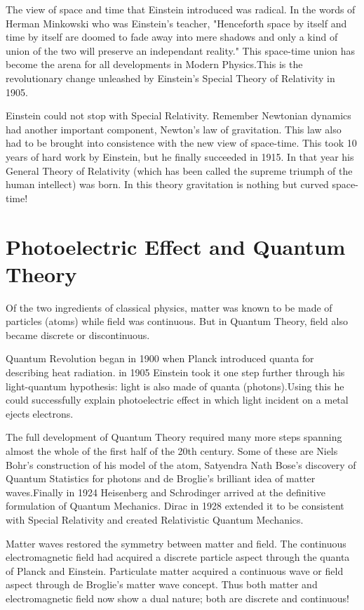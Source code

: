 The view of space and time that Einstein introduced
was radical. In the words of Herman Minkowski who
was Einstein's teacher, "Henceforth space by itself
and time by itself are doomed to fade away into mere
shadows and only a kind of union of the two will
preserve an independant reality." This space-time
union has become the arena for all developments in
Modern Physics.This is the revolutionary change
unleashed by Einstein's Special Theory of Relativity
in 1905.

Einstein could not stop with Special Relativity. Remember
Newtonian dynamics had another important component, Newton's
law of gravitation. This law also had to be brought into
consistence with the new view of space-time. This
took 10 years of hard work by Einstein, but he finally
succeeded in 1915. In that year his General Theory of
Relativity (which has been called the supreme triumph
of the human intellect) was born. In this theory gravitation
is nothing but curved space-time!

\section*{Photoelectric Effect and Quantum Theory}

Of the two ingredients of classical physics, matter was known
to be made of particles (atoms) while field was continuous.
But in Quantum Theory, field also became discrete or discontinuous.

Quantum Revolution began in 1900 when Planck introduced quanta
for describing heat radiation. in 1905 Einstein took it one step
further through his light-quantum hypothesis: light is also made
of quanta (photons).Using this he could successfully explain
photoelectric effect in which light incident on a metal ejects
electrons.

The full development of Quantum Theory required many more steps
spanning almost the whole of the first half of the 20th
century. Some of these are Niels Bohr's construction of his model
of the atom, Satyendra Nath Bose's discovery of Quantum Statistics
for photons and de Broglie's brilliant idea of matter waves.Finally
in 1924 Heisenberg and Schrodinger arrived at the definitive
formulation of Quantum Mechanics. Dirac in 1928 extended it to
be consistent with Special Relativity and created Relativistic
Quantum Mechanics.

Matter waves restored the symmetry between matter and field. The
continuous electromagnetic field had acquired a discrete particle
aspect through the quanta of Planck and Einstein. Particulate
matter acquired a continuous wave or field aspect through de Broglie's
matter wave concept. Thus both matter and electromagnetic field now
show a dual nature; both are discrete and continuous!

